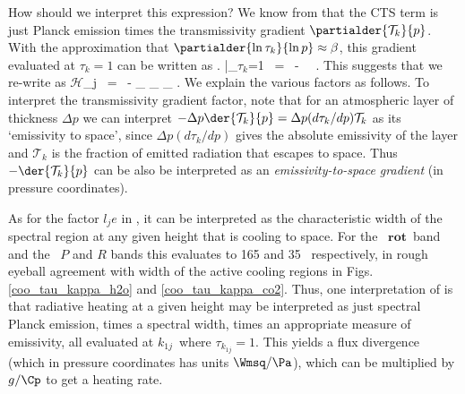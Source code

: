 \documentclass[10pt]{article}
\newcommand{\trans}{\ensuremath{\mathcal{T}}}
\newcommand{\ch}{\ensuremath{\mathcal{H}}}
\newcommand{\lj}{\ensuremath{l_j}}
\newcommand{\tauk}{\ensuremath{\tau_k}}
\newcommand{\CTS}{\ensuremath{\mathrm{CTS}}}
\newcommand{\konej}{\ensuremath{k_{1j}}}
\newcommand{\rot}{\ensuremath{\mathbf{rot}}}
\begin{document}
How should we interpret this expression? We know from  that the CTS term is just Planck emission times the transmissivity gradient $\partialder{\trans_k}{p}$. With the approximation that $\partialder{\ln\tauk}{\ln p} \approx \beta$, this gradient evaluated at $\tauk=1$ can be written as 
\beqn
	\left. \partialder{\trans_k}{p} \right |_{\tauk=1}  \ =  \ -\  \ .
\eeqn
This suggests that we re-write  as 
	\beqn
		\ch_j \ = \ - \underbrace{\pi B(\konej,T)}_{ }
					   _{ } 
					   \underbrace{(\lj e)}_{ }    \; .
		\label{heat_cts4}
	\eeqn
We explain the various factors as follows. To interpret the transmissivity gradient factor, note that for an atmospheric layer of thickness $\Delta p$ we can interpret $-\Delta p\der{\trans_k}{p}  = \Delta p (d \tauk/dp)\trans_k$ as its `emissivity to space', since $\Delta p(d \tauk/dp)$ gives the absolute  emissivity of the layer and $\trans_k$ is the fraction of emitted radiation that escapes to space. Thus $-\der{\trans_k}{p}$ can be also be interpreted as an \emph{emissivity-to-space gradient}  (in pressure coordinates). 


As for the factor $\lj e$ in , it can be interpreted as the characteristic  width of the spectral region at any given height that is cooling to space. For the \htwo\ \rot\ band and the  \cotwo\ $P$ and $R$ bands this evaluates to 165 and 35 \cminverse\   respectively, in rough eyeball agreement with width of the active cooling regions in Figs. \ref{coo_tau_kappa_h2o} and \ref{coo_tau_kappa_co2}.  Thus, one interpretation of   is that radiative heating at a given height  may be interpreted as just spectral Planck emission, times a spectral width,  times an appropriate measure of emissivity,  all evaluated at \konej\ where $\tau_{\konej}=1$. This yields a flux divergence (which in pressure coordinates has units $\Wmsq/\Pa$), which can be multiplied by $g/\Cp$ to get a heating rate.
 
\end{document}
